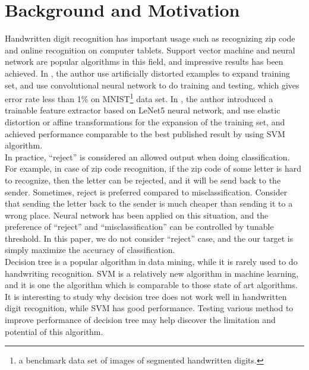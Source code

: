 \documentclass[a4paper,11pt]{nurop}
\begin{document}
\section{Background and Motivation}
Handwritten digit recognition has important usage such as recognizing zip code and online recognition on computer tablets. Support vector machine and neural network are popular algorithms in this field, and impressive results has been achieved. In \cite{lecun98}, the author use artificially distorted examples to expand training set, and use convolutional neural network to do training and testing, which gives error rate less than 1\% on MNIST\footnote{a benchmark data set of images of segmented handwritten digits.} data set. In \cite{fabien06}, the author introduced a trainable feature extractor based on LeNet5 neural network, and use elastic distortion or affine transformations for the expansion of the training set, and achieved performance comparable to the best published result by using SVM algorithm.\\
In practice, ``reject'' is considered an allowed output when doing classification. For example, in case of zip code recognition, if the zip code of some letter is hard to recognize, then the letter can be rejected, and it will be send back to the sender. Sometimes, reject is preferred compared to misclassification. Consider that sending the letter back to the sender is much cheaper than sending it to a wrong place. Neural network has been applied on this situation, and the preference of ``reject'' and ``misclassification'' can be controlled by tunable threshold\cite{slg92}. In this paper, we do not consider ``reject'' case, and the our target is simply maximize the accuracy of classification.\\
Decision tree is a popular algorithm in data mining, while it is rarely used to do handwriting recognition. SVM is a relatively new algorithm in machine learning, and it is one the algorithm which is comparable to those state of art algorithms\cite{lecun98}.\\
It is interesting to study why decision tree does not work well in handwritten digit recognition, while SVM has good performance. Testing various method to improve performance of decision tree may help discover the limitation and potential of this algorithm.
\end{document}
